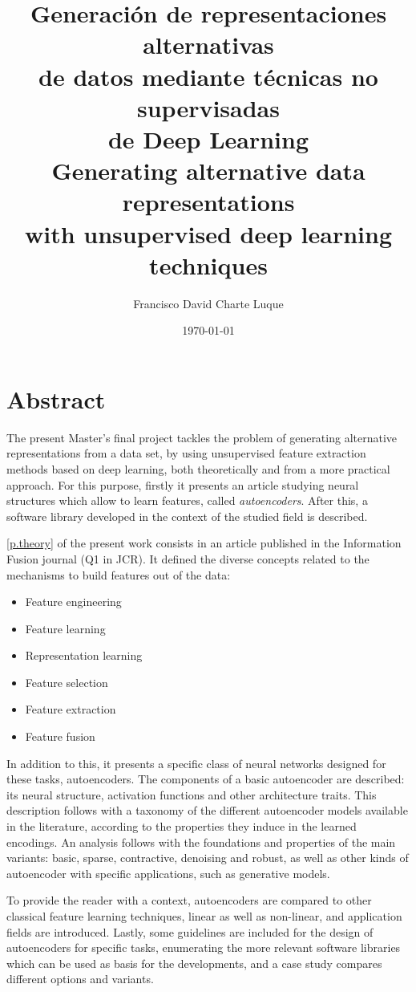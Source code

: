 \documentclass[oneside,openright,titlepage,numbers=noenddot,openany,headinclude,footinclude=true,
cleardoublepage=empty,abstractoff,BCOR=5mm,paper=a4,fontsize=12pt,main=spanish]{scrreprt}
\author{Francisco David Charte Luque}
\date{\today}
\title{Generación de representaciones alternativas\\de datos mediante técnicas no supervisadas\\de Deep Learning\\\vspace{1em}Generating alternative data representations\\with unsupervised deep learning techniques}
\DeclareRobustCommand{\chaptertitle}[1]{\textls[80]{\scshape #1}}
\begin{document}
\maketitle
\tableofcontents

\clearpage

\chapter*{Abstract}
\addcontentsline{toc}{chapter}{\chaptertitle{abstract}}

The present Master's final project tackles the problem of generating alternative representations from a data set, by using unsupervised feature extraction methods based on deep learning, both theoretically and from a more practical approach. For this purpose, firstly it presents an article studying neural structures which allow to learn features, called \textit{autoencoders}.  After this, a software library developed in the context of the studied field is described.

\autoref{p.theory} of the present work consists in an article published in the Information Fusion journal (Q1 in JCR). It defined the diverse concepts related to the mechanisms to build features out of the data:
\begin{itemize}
\item Feature engineering
\item Feature learning
\item Representation learning
\item Feature selection
\item Feature extraction
\item Feature fusion
\end{itemize}

In addition to this, it presents a specific class of neural networks designed for these tasks, autoencoders. The components of a basic autoencoder are described: its neural structure, activation functions and other architecture traits. This description follows with a taxonomy of the different autoencoder models available in the literature, according to the properties they induce in the learned encodings. An analysis follows with the foundations and properties of the main variants: basic, sparse, contractive, denoising and robust, as well as other kinds of autoencoder with specific applications, such as generative models.

To provide the reader with a context, autoencoders are compared to other classical feature learning techniques, linear as well as non-linear, and application fields are introduced. Lastly, some guidelines are included for the design of autoencoders for specific tasks, enumerating the more relevant software libraries which can be used as basis for the developments, and a case study compares different options and variants.
\end{document}

